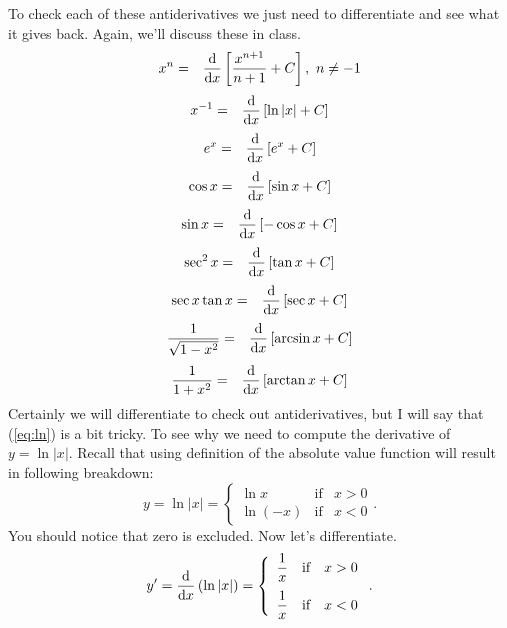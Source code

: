 \documentclass[12pt,addpoints, answers, fleqn]{exam}
\begin{document}
To check each of these antiderivatives we just need to differentiate and see what it gives back. Again, we'll discuss these in class.
\begin{eqnarray}
x^n &=& \frac{{\rm{d}}}{{\rm{d}}x} \left[ \frac{x^{n+1}}{n+1} + C\right], \ n \neq -1
\end{eqnarray}
\begin{eqnarray}
x^{-1} &=& \frac{{\rm{d}}}{{\rm{d}}x} \left[\ln \left| x \right| + C\right] \label{eq:ln}
\end{eqnarray}
\begin{eqnarray}
e^x &=& \frac{{\rm{d}}}{{\rm{d}}x} \left[  e^x + C\right]
\end{eqnarray}
\begin{eqnarray}
\cos x &=& \frac{{\rm{d}}}{{\rm{d}}x} \left[  \sin x + C\right]
\end{eqnarray}
\begin{eqnarray}
\sin x &=& \frac{{\rm{d}}}{{\rm{d}}x} \left[  -\cos x + C\right]
\end{eqnarray}
\begin{eqnarray}
\sec^2 x &=& \frac{{\rm{d}}}{{\rm{d}}x} \left[  \tan x + C\right]
\end{eqnarray}
\begin{eqnarray}
\sec x \tan x &=& \frac{{\rm{d}}}{{\rm{d}}x} \left[  \sec x + C\right]
\end{eqnarray}
\begin{eqnarray}
\displaystyle \frac{1}{\sqrt{1-x^2}} &=& \frac{{\rm{d}}}{{\rm{d}}x} \left[  \arcsin x + C\right]
\end{eqnarray}
\begin{eqnarray}
\displaystyle \frac{1}{1+x^2} &=& \frac{{\rm{d}}}{{\rm{d}}x} \left[  \arctan x + C\right]
\end{eqnarray}
Certainly we will differentiate to check out antiderivatives, but I will say that (\ref{eq:ln}) is a bit tricky. To see why we need to compute the derivative of $y = \ln \left| x \right|$. Recall that using definition of the absolute value function will result in following breakdown:
\[
y = \ln \left| x \right| =
\left\{ {\begin{array}{lcc}
  {\ln x} & {\mbox{if}} & { x > 0}\\
  {\ln \left(-x\right)} & {\mbox{if}} & { x<0}
\end{array}} \right..
\]
You should notice that zero is excluded. Now let's differentiate.
\[
y' = \frac{{\rm{d}}}{{\rm{d}}x} \left( \ln \left| x \right| \right)=
\left\{ {\begin{array}{lcc}
  {\displaystyle \frac{1}{x}} & {\mbox{if}} & { x > 0}\\[10pt]
  {\displaystyle \frac{1}{x}} & {\mbox{if}} & { x<0}
\end{array}} \right..
\]
\end{document}

